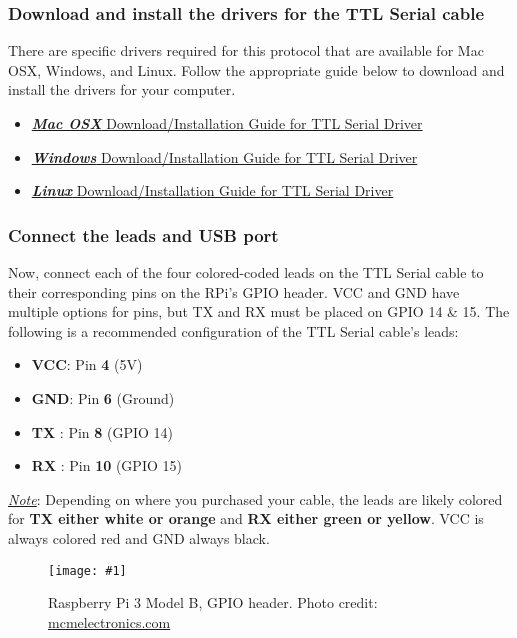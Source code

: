 \documentclass{article}
\newcommand{\imagefig}[2]{
    \begin{figure}[H]
        \centering
        \texttt{[image: \#1]}
        \caption{#2}
    \end{figure}
}
\begin{document}
    \subsubsection{Download and install the drivers for the TTL Serial cable}
    There are specific drivers required for this protocol that are available for Mac OSX, Windows, and Linux. Follow the appropriate guide below to download and install the drivers for your computer.
    \begin{itemize}
      \item \href{https://learn.adafruit.com/adafruits-raspberry-pi-lesson-5-using-a-console-cable/software-installation-mac}{\textit{\textbf{Mac OSX}} Download/Installation Guide for TTL Serial Driver}
      \item \href{https://learn.adafruit.com/adafruits-raspberry-pi-lesson-5-using-a-console-cable/software-installation-windows}{\textit{\textbf{Windows}} Download/Installation Guide for TTL Serial Driver}
      \item \href{https://learn.adafruit.com/adafruits-raspberry-pi-lesson-5-using-a-console-cable/software-installation-linux}{\textit{\textbf{Linux}} Download/Installation Guide for TTL Serial Driver}
    \end{itemize}

    \subsubsection{Connect the leads and USB port}
    Now, connect each of the four colored-coded leads on the TTL Serial cable to their corresponding pins on the RPi's GPIO header. VCC and GND have multiple options for pins, but TX and RX must be placed on GPIO 14 \& 15. The following is a recommended configuration of the TTL Serial cable's leads:
    \begin{itemize}
      \item \textbf{VCC}: Pin \textbf{4} (5V)
      \item \textbf{GND}: Pin \textbf{6} (Ground)
      \item \textbf{TX }: Pin \textbf{8} (GPIO 14)
      \item \textbf{RX }: Pin \textbf{10} (GPIO 15)
    \end{itemize}
    \underline{\textit{Note}}: Depending on where you purchased your cable, the leads are likely colored for \textbf{TX either white or orange} and \textbf{RX either green or yellow}. VCC is always colored red and GND always black.
    \imagefig{rpi3mb-gpio.png}{Raspberry Pi 3 Model B, GPIO header. \colorbox{BurntOrange}{Photo credit: \href{http://blog.mcmelectronics.com/post/Raspberry-Pi-3-GPIO-Pin-Layout}{mcmelectronics.com}}}
\end{document}
